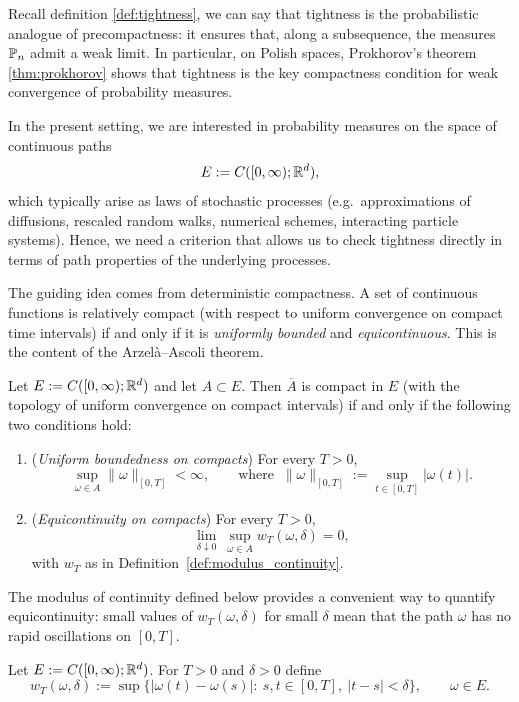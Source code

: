 \medskip
Recall definition \ref{def:tightness}, we can say that tightness is the probabilistic analogue of precompactness:
it ensures that, along a subsequence, the measures $\mathbb{P}_n$ admit a weak limit.
In particular, on Polish spaces, Prokhorov's theorem \ref{thm:prokhorov} shows that tightness is the key compactness
condition for weak convergence of probability measures.

\medskip
In the present setting, we are interested in probability measures on the space of continuous paths
\[
E := C([0,\infty);\mathbb{R}^d),
\]
which typically arise as laws of stochastic processes (e.g.\ approximations of diffusions, rescaled random walks,
numerical schemes, interacting particle systems).  Hence, we need a criterion that allows us to check tightness
directly in terms of path properties of the underlying processes.

\medskip
The guiding idea comes from deterministic compactness.  A set of continuous functions is relatively compact
(with respect to uniform convergence on compact time intervals) if and only if it is \emph{uniformly bounded}
and \emph{equicontinuous}.  This is the content of the Arzel\`a--Ascoli theorem.

\begin{proposition}\label{prop:AA_C0infty}
Let $E:=C([0,\infty);\mathbb{R}^d)$ and let $A\subset E$.
Then $\overline{A}$ is compact in $E$ (with the topology of uniform convergence on compact
intervals) if and only if the following two conditions hold:
\begin{enumerate}[label=\textnormal{(\roman*)}, leftmargin=3.2em]
\item (\emph{Uniform boundedness on compacts}) For every $T>0$,
\[
\sup_{\omega\in A}\|\omega\|_{[0,T]} < \infty,
\qquad\text{where }\ \|\omega\|_{[0,T]}:=\sup_{t\in[0,T]}|\omega(t)|.
\]
\item (\emph{Equicontinuity on compacts}) For every $T>0$,
\[
\lim_{\delta\downarrow 0}\ \sup_{\omega\in A} w_T(\omega,\delta)=0,
\]
with $w_T$ as in Definition~\ref{def:modulus_continuity}.
\end{enumerate}
\end{proposition}

The modulus of continuity defined below provides a convenient way to quantify equicontinuity: small values of $w_T(\omega,\delta)$ for small $\delta$
mean that the path $\omega$ has no rapid oscillations on $[0,T]$.

\begin{definition}\label{def:modulus_continuity}
Let $E:=C([0,\infty);\mathbb{R}^d)$. For $T>0$ and $\delta>0$ define
\[
w_T(\omega,\delta)
:=\sup\bigl\{|\omega(t)-\omega(s)|:\ s,t\in[0,T],\ |t-s|<\delta\bigr\},
\qquad \omega\in E.
\]
\end{definition}

